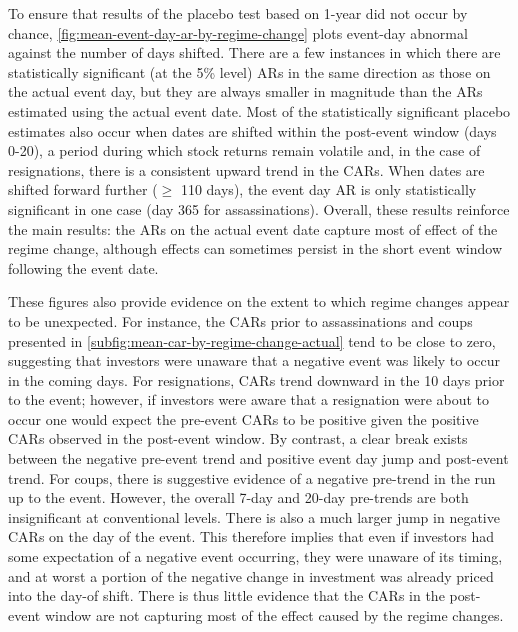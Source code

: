 \documentclass[12pt,final,fleqn]{article}
\theoremstyle{plain}
\begin{document}
To ensure that results of the placebo test based on 1-year did not occur by chance, \autoref{fig:mean-event-day-ar-by-regime-change} plots event-day abnormal against the number of days shifted. There are a few instances in which there are statistically significant (at the 5\% level) ARs in the same direction as those on the actual event day, but they are always smaller in magnitude than the ARs estimated using the actual event date. Most of the statistically significant placebo estimates also occur when dates are shifted within the post-event window (days 0-20), a period during which stock returns remain volatile and, in the case of resignations, there is a consistent upward trend in the CARs. When dates are shifted forward further ($\geq$ 110 days), the event day AR is only statistically significant in one case (day 365 for assassinations). Overall, these results reinforce the main results: the ARs on the actual event date capture most of effect of the regime change, although effects can sometimes persist in the short event window following the event date. 

These figures also provide evidence on the extent to which regime changes appear to be unexpected. For instance, the CARs prior to assassinations and coups presented in \autoref{subfig:mean-car-by-regime-change-actual} tend to be close to zero, suggesting that investors were unaware that a negative event was likely to occur in the coming days. For resignations, CARs trend downward in the 10 days prior to the event; however, if investors were aware that a resignation were about to occur one would expect the pre-event CARs to be positive given the positive CARs observed in the post-event window. By contrast, a clear break exists between the negative pre-event trend and positive event day jump and post-event trend.  For coups, there is suggestive evidence of a negative pre-trend in the run up to the event. However, the overall 7-day and 20-day pre-trends are both insignificant at conventional levels. There is also a much larger jump in negative CARs on the day of the event. This therefore implies that even if investors had some expectation of a negative event occurring, they were unaware of its timing, and at worst a portion of the negative change in investment was already priced into the day-of shift. There is thus little evidence that the CARs in the post-event window are not capturing most of the effect caused by the regime changes.
\end{document}
